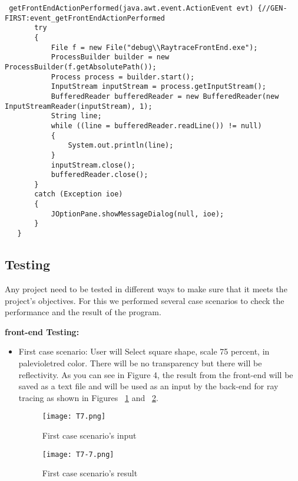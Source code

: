 \documentclass{article}
\begin{document}
\begin{enumerate}
 \begin{lstlisting}
 getFrontEndActionPerformed(java.awt.event.ActionEvent evt) {//GEN-FIRST:event_getFrontEndActionPerformed
       try
       {
           File f = new File("debug\\RaytraceFrontEnd.exe");
           ProcessBuilder builder = new ProcessBuilder(f.getAbsolutePath());
           Process process = builder.start();
           InputStream inputStream = process.getInputStream();
           BufferedReader bufferedReader = new BufferedReader(new InputStreamReader(inputStream), 1);
           String line;
           while ((line = bufferedReader.readLine()) != null)
           {
               System.out.println(line);
           }
           inputStream.close();
           bufferedReader.close();
       }
       catch (Exception ioe)
       {
           JOptionPane.showMessageDialog(null, ioe);
       }
   }
 \end{lstlisting}
 
\end{enumerate}



 \newpage
\subsection{Testing}
Any project need to be tested in different ways to make sure that it meets the project’s objectives. For this we performed several case scenarios to check the performance and the result of the program. \newline



\textbf{front-end Testing:}

\begin{itemize}
    \item First case scenario: \newline
    User will Select square shape, scale 75 percent, in palevioletred color. There will be no transparency but there will be reflectivity. As you can see in Figure 4, the result from the front-end will be saved as a text file and will be used as an input by the back-end for ray tracing as shown in Figures ~\ref{test1} and ~\ref{test1-1}. 
    
    \begin{figure}[H]
\centering
\texttt{[image: T7.png]}
\caption{First case scenario's input \label{test1}}
\end{figure}

\begin{figure}
    \centering
    \texttt{[image: T7-7.png]}
    \caption{First case scenario's result}
    \label{test1-1}
\end{figure}

\end{itemize}
\end{document}
